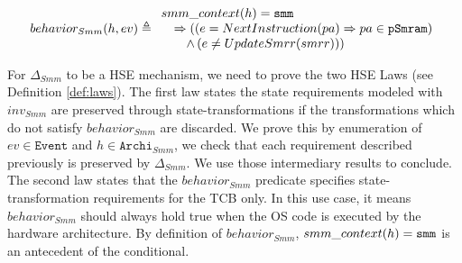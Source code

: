 \[
  behavior_{Smm}(h, ev) \triangleq \begin{array}{l}
                                           smm\_context(h) = \mathtt{smm} \\
                                           \quad \Rightarrow ((e =
                                           NextInstruction(pa)
                                           \Rightarrow pa \in \texttt{pSmram}) \\
                                           \qquad \wedge\,(e \neq UpdateSmrr(smrr))) \\
                                         \end{array}
                                       \]

                                       For $\Delta_{Smm}$ to be a HSE mechanism,
                                       we need to prove the two HSE Laws (see
                                       Definition \ref{def:laws}).  The first
                                       law states the state requirements modeled
                                       with $inv_{Smm}$ are preserved through
                                       state-transformations if the
                                       transformations which do not satisfy
                                       $behavior_{Smm}$ are discarded. We prove
                                       this by enumeration of
                                       $ev \in \texttt{Event}$ and
                                       $h \in \texttt{Archi}_{Smm}$, we check
                                       that each requirement described
                                       previously is preserved by
                                       $\Delta_{Smm}$. We use those intermediary
                                       results to conclude. The second law
                                       states that the $behavior_{Smm}$
                                       predicate specifies
                                       state-trans\-formation requirements for
                                       the TCB only. In this use case, it means
                                       $behavior_{Smm}$ should always hold true
                                       when the OS code is executed by the
                                       hardware architecture.  By definition of
                                       $behavior_{Smm}$,
                                       $smm\_context(h) = \mathtt{smm}$ is an
                                       antecedent of the conditional.

